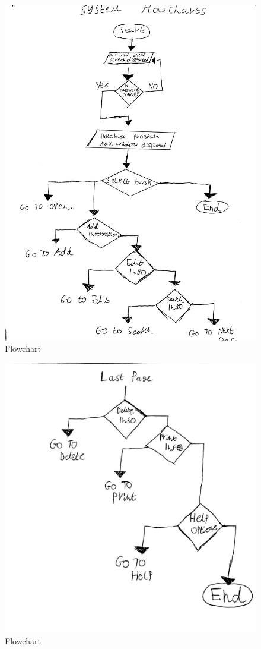 \begin{figure}[H]
    \includegraphics[width=\textwidth]{flowchart 5.jpg}
    \caption{Flowchart} \label{fig:Flowchart}
\end{figure}


\begin{figure}[H]
    \includegraphics[width=\textwidth]{flowchart4.jpg}
    \caption{Flowchart} \label{fig:Flowchart}
\end{figure}

